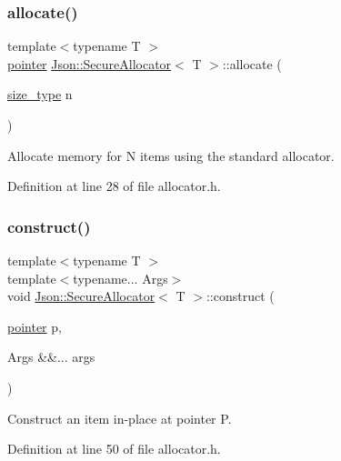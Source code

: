 \subsubsection{\texorpdfstring{allocate()}{allocate()}}
{\footnotesize\ttfamily template$<$typename T $>$ \\
\hyperlink{class_json_1_1_secure_allocator_a442c09b3267622d23416d9072ea1afe9}{pointer} \hyperlink{class_json_1_1_secure_allocator}{Json\+::\+Secure\+Allocator}$<$ T $>$\+::allocate (\begin{DoxyParamCaption}\item[{\hyperlink{class_json_1_1_secure_allocator_a61c258f0ae80af6982fae200b55a4dc9}{size\+\_\+type}}]{n }\end{DoxyParamCaption})\hspace{0.3cm}{\ttfamily [inline]}}

Allocate memory for N items using the standard allocator. 

Definition at line 28 of file allocator.\+h.

\hypertarget{class_json_1_1_secure_allocator_acd466192ba41ea5468bd2f45ae9de9fb}{}\label{class_json_1_1_secure_allocator_acd466192ba41ea5468bd2f45ae9de9fb} 
\subsubsection{\texorpdfstring{construct()}{construct()}}
{\footnotesize\ttfamily template$<$typename T $>$ \\
template$<$typename... Args$>$ \\
void \hyperlink{class_json_1_1_secure_allocator}{Json\+::\+Secure\+Allocator}$<$ T $>$\+::construct (\begin{DoxyParamCaption}\item[{\hyperlink{class_json_1_1_secure_allocator_a442c09b3267622d23416d9072ea1afe9}{pointer}}]{p,  }\item[{Args \&\&...}]{args }\end{DoxyParamCaption})\hspace{0.3cm}{\ttfamily [inline]}}

Construct an item in-\/place at pointer P. 

Definition at line 50 of file allocator.\+h.

\hypertarget{class_json_1_1_secure_allocator_a93c86d9e9031b81a046b3db8897811f2}{}\label{class_json_1_1_secure_allocator_a93c86d9e9031b81a046b3db8897811f2} 
